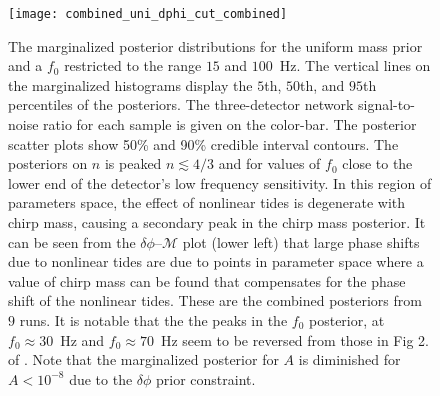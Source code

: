 \begin{figure}[th]
\texttt{[image: combined\_uni\_dphi\_cut\_combined]}
\caption{The marginalized posterior distributions for the uniform mass prior and a $f_0$ restricted to the range $15$ and $100$~Hz. The vertical lines on the marginalized histograms display the $5$th, $50$th, and $95$th percentiles of the posteriors. The three-detector network signal-to-noise ratio for each sample is given on the color-bar. The posterior scatter plots show 50\% and 90\% credible interval contours. The posteriors on $n$ is peaked $n \lesssim 4/3$ and for values of $f_0$ close to the lower end of the detector's low frequency sensitivity. In this region of parameters space, the effect of nonlinear tides is degenerate with chirp mass, causing a secondary peak in the chirp mass posterior. It can be seen from the $\delta\phi$--$\mathcal{M}$ plot (lower left) that large phase shifts due to nonlinear tides are due to points in parameter space where a value of chirp mass can be found that compensates for the phase shift of the nonlinear tides. These are the combined posteriors from $9$ runs. It is notable that the the peaks in the $f_0$ posterior, at $f_0 \approx 30$~Hz and $f_0 \approx 70$~Hz seem to be reversed from those in Fig 2. of \citep{abbott2019constraining}. Note that the marginalized posterior for $A$ is diminished for $A < 10^{-8}$ due to the $\delta \phi$ prior constraint.
}
\label{fig:uniform_f0_small}
\end{figure}
